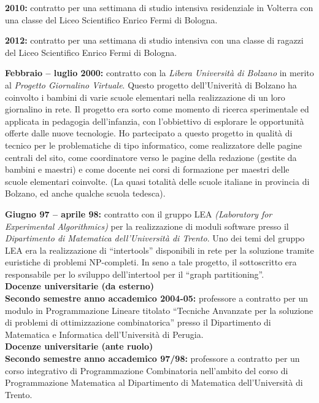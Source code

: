 \documentclass[10pt]{article}
\newcommand{\subvoice}[1] { {\large \bf #1} \smallskip\\ }
\begin{document}
\noindent
{\bf 2010:}
contratto per una settimana di studio intensiva residenziale in Volterra
con una classe del Liceo Scientifico Enrico Fermi di Bologna. 

\noindent
{\bf 2012:}
contratto per una settimana di studio intensiva
con una classe di ragazzi del Liceo Scientifico Enrico Fermi di Bologna. 

\noindent
{\bf Febbraio -- luglio 2000:}
contratto con la {\em Libera Universit\`a di Bolzano}
in merito al {\em Progetto Giornalino Virtuale}.
Questo progetto dell'Univerit\`a di Bolzano
ha coinvolto i bambini di varie scuole elementari
nella realizzazione di un loro giornalino in rete.
Il progetto era sorto
come momento di ricerca sperimentale ed applicata
in pedagogia dell'infanzia, con l'obbiettivo
di esplorare le opportunit\`a offerte dalle nuove tecnologie. 
Ho partecipato a questo progetto
in qualit\`a di tecnico
per le problematiche di tipo informatico,
come realizzatore delle pagine centrali del sito,
come coordinatore verso le pagine della redazione (gestite da bambini
e maestri) e come docente nei corsi di formazione per
maestri delle scuole elementari coinvolte.
(La quasi totalit\`a delle scuole italiane in provincia di Bolzano,
ed anche qualche scuola tedesca).

\noindent
{\bf Giugno 97 -- aprile 98:}
contratto con il gruppo LEA {\em (Laboratory for Experimental Algorithmics)}
per la realizzazione di moduli software
presso il {\em Dipartimento di Matematica dell'Universit\`a di Trento}.
Uno dei temi del gruppo LEA
era la realizzazione di ``intertools''
disponibili in rete per la soluzione tramite euristiche
di problemi NP-completi.
In seno a tale progetto,
il sottoscritto era responsabile per lo sviluppo dell'intertool
per il ``graph partitioning''.\\

\subvoice{Docenze universitarie (da esterno)}
{\bf Secondo semestre anno accademico 2004-05:}
professore a contratto per un modulo in Programmazione Lineare
titolato ``Tecniche Anvanzate per la soluzione di problemi di ottimizzazione
combinatorica''
presso il Dipartimento di Matematica e Informatica
dell'Universit\`a di Perugia.\\

\subvoice{Docenze universitarie (ante ruolo)}
{\bf Secondo semestre anno accademico 97/98:}
professore a contratto per 
un corso integrativo di Programmazione Combinatoria
nell'ambito del corso di Programmazione Matematica
al Dipartimento di Matematica dell'Universit\`a di Trento.\\
\end{document}
